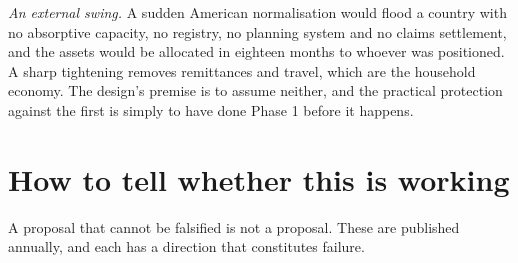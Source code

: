 \emph{An external swing.} A sudden American normalisation would flood a country
with no absorptive capacity, no registry, no planning system and no claims
settlement, and the assets would be allocated in eighteen months to whoever was
positioned. A sharp tightening removes remittances and travel, which are the
household economy. The design's premise is to assume neither, and the practical
protection against the first is simply to have done Phase 1 before it happens.

\section{How to tell whether this is working}

A proposal that cannot be falsified is not a proposal. These are published
annually, and each has a direction that constitutes failure.

